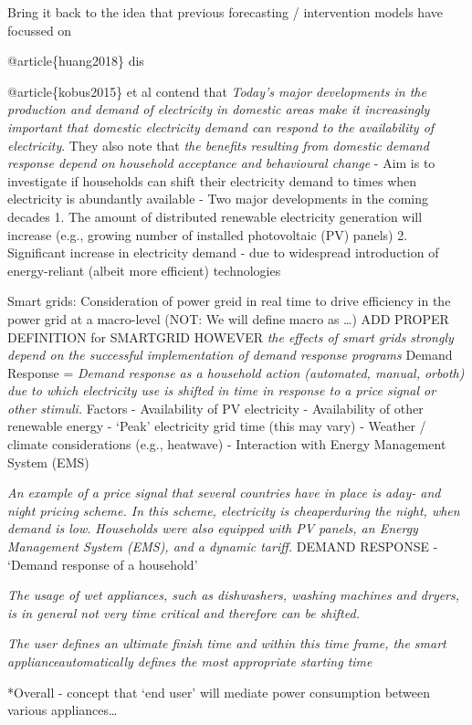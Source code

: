 \documentclass[11pt]{article}
\begin{document}
Bring it back to the idea that previous forecasting / intervention
models have focussed on

@article\{huang2018\} dis

@article\{kobus2015\} et al contend that \emph{Today's major
developments in the production and demand of electricity in domestic
areas make it increasingly important that domestic electricity demand
can respond to the availability of electricity}. They also note that
\emph{the benefits resulting from domestic demand response depend on
household acceptance and behavioural change} - Aim is to investigate if
households can shift their electricity demand to times when electricity
is abundantly available - Two major developments in the coming decades
1. The amount of distributed renewable electricity generation will
increase (e.g., growing number of installed photovoltaic (PV) panels) 2.
Significant increase in electricity demand - due to widespread
introduction of energy-reliant (albeit more efficient) technologies

Smart grids: Consideration of power greid in real time to drive
efficiency in the power grid at a macro-level (NOT: We will define macro
as \ldots) ADD PROPER DEFINITION for SMARTGRID HOWEVER \emph{the effects
of smart grids strongly depend on the successful implementation of
demand response programs} Demand Response = \emph{Demand response as a
household action (automated, manual, orboth) due to which electricity
use is shifted in time in response to a price signal or other stimuli.}
Factors - Availability of PV electricity - Availability of other
renewable energy - `Peak' electricity grid time (this may vary) -
Weather / climate considerations (e.g., heatwave) - Interaction with
Energy Management System (EMS)

\emph{An example of a price signal that several countries have in place
is aday- and night pricing scheme. In this scheme, electricity is
cheaperduring the night, when demand is low.} \emph{Households were also
equipped with PV panels, an Energy Management System (EMS), and a
dynamic tariff.} DEMAND RESPONSE - `Demand response of a household'

\emph{The usage of wet appliances, such as dishwashers, washing machines
and dryers, is in general not very time critical and therefore can be
shifted.}

\emph{The user defines an ultimate finish time and within this time
frame, the smart applianceautomatically defines the most appropriate
starting time}

*Overall - concept that `end user' will mediate power consumption
between various appliances\ldots{}
\end{document}

